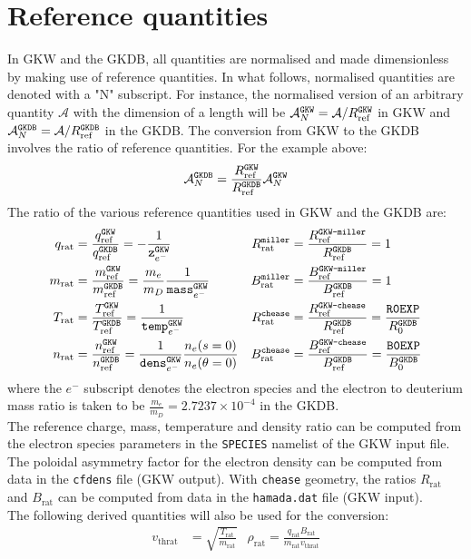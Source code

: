 \documentclass[a4paper]{report}
\begin{document}
\section{Reference quantities}
In GKW and the GKDB, all quantities are normalised and made dimensionless by making use of reference quantities. In what follows, normalised quantities are denoted with a "N" subscript. For instance, the normalised version of an arbitrary quantity $\mathcal{A}$ with the dimension of a length will be $\mathcal{A}_N^{\texttt{GKW}}=\mathcal{A}/R_{\textrm{ref}}^{\texttt{GKW}}$ in GKW and $\mathcal{A}_N^{\texttt{GKDB}}=\mathcal{A}/R_{\textrm{ref}}^{\texttt{GKDB}}$ in the GKDB. The conversion from GKW  to the GKDB  involves the ratio of reference quantities. For the example above:
\begin{equation}
\mathcal{A}_N^{\texttt{GKDB}} = \frac{R_{\textrm{ref}}^{\texttt{GKW}}}{R_{\textrm{ref}}^{\texttt{GKDB}}} \mathcal{A}_N^{\texttt{GKW}}
\end{equation}
The ratio of the various reference quantities used in GKW and the GKDB are:
\begin{align*}
q_\textrm{rat} &=  \frac{q_{\textrm{ref}}^{\texttt{GKW}}}{q_{\textrm{ref}}^{\texttt{GKDB}}} = - \frac{1}{\texttt{z}^{\texttt{GKW}}_{e^-}} & R_\textrm{rat}^\texttt{miller} &= \frac{R_{\textrm{ref}}^\texttt{GKW-miller}}{R_{\textrm{ref}}^{\texttt{GKDB}}} = 1 \\
m_\textrm{rat} &=  \frac{m_{\textrm{ref}}^{\texttt{GKW}}}{m_{\textrm{ref}}^{\texttt{GKDB}}} = \frac{m_e}{m_D}\frac{1}{\texttt{mass}^{\texttt{GKW}}_{e^-}} & B_\textrm{rat}^\texttt{miller} &= \frac{B_{\textrm{ref}}^\texttt{GKW-miller}}{B_{\textrm{ref}}^{\texttt{GKDB}}} = 1 \\
T_\textrm{rat} &=  \frac{T_{\textrm{ref}}^{\texttt{GKW}}}{T_{\textrm{ref}}^{\texttt{GKDB}}} = \frac{1}{\texttt{temp}^{\texttt{GKW}}_{e^-}} &R_\textrm{rat}^\texttt{chease} &= \frac{R_{\textrm{ref}}^\texttt{GKW-chease}}{R_{\textrm{ref}}^{\texttt{GKDB}}} = \frac{\texttt{R0EXP}}{R_0^{\texttt{GKDB}}}  \\
n_\textrm{rat} &=  \frac{n_{\textrm{ref}}^{\texttt{GKW}}}{n_{\textrm{ref}}^{\texttt{GKDB}}} = \frac{1}{\texttt{dens}^{\texttt{GKW}}_{e^-}} \frac{n_e(s=0)}{n_e(\theta=0)} & B_\textrm{rat}^\texttt{chease} &= \frac{B_{\textrm{ref}}^\texttt{GKW-chease}}{B_{\textrm{ref}}^{\texttt{GKDB}}} = \frac{\texttt{B0EXP}}{B_0^{\texttt{GKDB}}}
\end{align*}
where the $e^-$ subscript denotes the electron species and the electron to deuterium mass ratio is taken to be $\frac{m_e}{m_D}=2.7237 \times 10^{-4}$ in the GKDB.\\
The reference charge, mass, temperature and density ratio can be computed from the electron species parameters in the \texttt{SPECIES} namelist of the GKW input file. The poloidal asymmetry factor for the electron density can be computed from data in the \texttt{cfdens} file (GKW output).  With \texttt{chease} geometry, the ratios $ R_\textrm{rat}$ and $ B_\textrm{rat}$ can be computed from data in the \texttt{hamada.dat} file (GKW input).\\
The following derived quantities will also be used for the conversion:
\begin{align*}
v_\textrm{thrat} &= \sqrt{\frac{T_\textrm{rat}}{m_\textrm{rat}}} & \rho_\textrm{rat} = \frac{q_\textrm{rat} B_\textrm{rat}}{m_\textrm{rat}v_\textrm{thrat}}
\end{align*}
\end{document}

